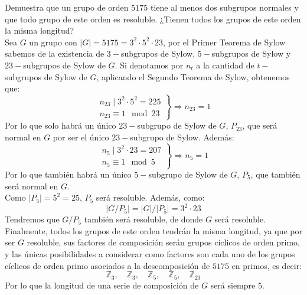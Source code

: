 \documentclass[12pt]{article}
\begin{document}
    \begin{ejercicio}[2.5 puntos]
        Demuestra que un grupo de orden $5175$ tiene al menos dos subgrupos normales y que todo grupo de este orden es resoluble. ¿Tienen todos los grupos de este orden la misma longitud?\\

        \noindent
        Sea $G$ un grupo con $|G| = 5175 = 3^2 \cdot 5^2 \cdot 23$, por el Primer Teorema de Sylow sabemos de la existencia de $3-$subgrupos de Sylow, $5-$subgrupos de Sylow y $23-$subgrupos de Sylow de $G$. Si denotamos por $n_t$ a la cantidad de $t-$subgrupos de Sylow de $G$, aplicando el Segundo Teorema de Sylow, obtenemos que:
        \begin{equation*}
            \left.\begin{array}{r}
                n_{23} \mid 3^2 \cdot 5^2 = 225 \\
                n_{23} \equiv 1 \mod 23
            \end{array}\right\} \Longrightarrow n_{23} = 1
        \end{equation*}
        Por lo que solo habrá un único $23-$subgrupo de Sylow de $G$, $P_{23}$, que será normal en $G$ por ser el único $23-$subgrupo de Sylow. Además:
        \begin{equation*}
            \left.\begin{array}{r}
                n_5 \mid 3^2 \cdot 23 = 207 \\
                n_5 \equiv 1 \mod 5
            \end{array}\right\} \Longrightarrow n_5 = 1
        \end{equation*}
        Por lo que también habrá un único $5-$subgrupo de Sylow de $G$, $P_5$, que también será normal en $G$.\\

        \noindent
        Como $|P_5| = 5^2 = 25$, $P_5$ será resoluble. Además, como:
        \begin{equation*}
            |G/P_5| = |G|/|P_5| = 3^2\cdot 23
        \end{equation*}
        Tendremos que $G/P_5$ también será resoluble, de donde $G$ será resoluble.\\

        \noindent
        Finalmente, todos los grupos de este orden tendrán la misma longitud, ya que por ser $G$ resoluble, sus factores de composición serán grupos cíclicos de orden primo, y las únicas posibilidades a considerar como factores son cada uno de los grupos cíclicos de orden primo asociados a la descomposición de $5175$ en primos, es decir:
        \begin{equation*}
            \mathbb{Z}_3, \quad \mathbb{Z}_3, \quad \mathbb{Z}_5, \quad \mathbb{Z}_5, \quad \mathbb{Z}_{23}
        \end{equation*}
        Por lo que la longitud de una serie de composición de $G$ será siempre 5.
    \end{ejercicio}
\end{document}
